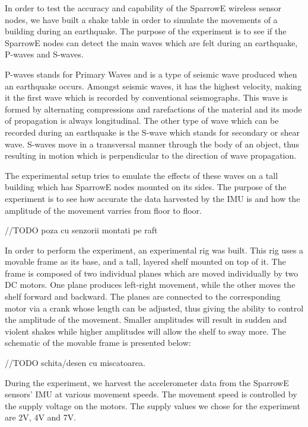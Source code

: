 In order to test the accuracy and capability of the SparrowE wireless sensor nodes, we 
have built a shake table in order to simulate the movements of a building during an earthquake.
The purpose of the experiment is to see if the SparrowE nodes can detect the main waves which 
are felt during an earthquake, P-waves and S-waves.

P-waves stands for Primary Waves and is a type of seismic wave produced when an earthquake occurs.
Amongst seismic waves, it has the highest velocity, making it the first wave which is recorded by 
conventional seismographs. This wave is formed by alternating compressions and rarefactions of the 
material and its mode of propagation is always longitudinal. The other type of wave which can be 
recorded during an earthquake is the S-wave which stands for secondary or shear wave. S-waves move 
in a transversal manner through the body of an object, thus resulting in motion which is perpendicular 
to the direction of wave propagation. 

The experimental setup tries to emulate the effects of these waves on a tall building which has SparrowE 
nodes mounted on its sides. The purpose of the experiment is to see how accurate the data harvested by the 
IMU is and how the amplitude of the movement varries from floor to floor.

//TODO poza cu senzorii montati pe raft

In order to perform the experiment, an experimental rig was built. This rig uses a movable frame as its base, 
and a tall, layered shelf mounted on top of it. The frame is composed of two individual planes which are moved 
individually by two DC motors. One plane produces left-right movement, while the other moves the shelf forward and 
backward. The planes are connected to the corresponding motor via a crank whose length can be adjusted, thus giving the 
ability to control the amplitude of the movement. Smaller amplitudes will result in sudden and violent shakes while 
higher amplitudes will allow the shelf to sway more. The schematic of the movable frame is presented below:

//TODO schita/desen cu miscatoarea.

During the experiment, we harvest the accelerometer data from the SparrowE sensors' IMU at various movement speeds.
The movement speed is controlled by the supply voltage on the motors. The supply values we chose for the experiment 
are 2V, 4V and 7V.

